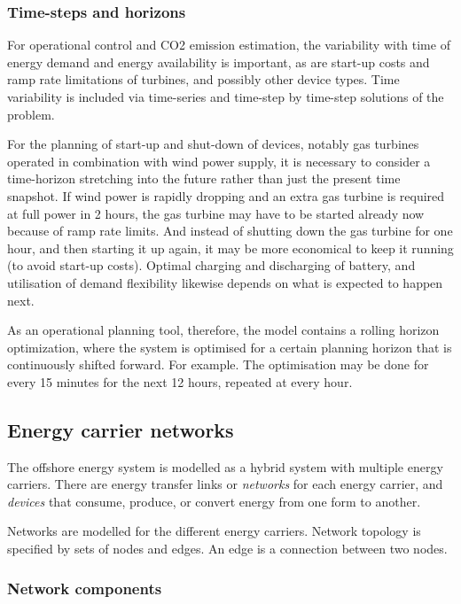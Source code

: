 \documentclass[12pt]{article}
\begin{document}
\subsubsection{Time-steps and horizons}

For operational control and CO2 emission estimation, the variability with time of energy demand and energy availability is important, as are start-up costs and ramp rate limitations of turbines, and possibly other device types. Time variability is included via time-series and time-step by time-step solutions of the problem.

For the planning of start-up and shut-down of devices, notably gas turbines operated in combination with wind power supply, it is necessary to consider a time-horizon stretching into the future rather than just the present time snapshot. If wind power is rapidly dropping and an extra gas turbine is required at full power in 2 hours, the gas turbine may have to be started already now because of ramp rate limits. And instead of shutting down the gas turbine for one hour, and then starting it up again, it may be more economical to keep it running (to avoid start-up costs). Optimal charging and discharging of battery, and utilisation of demand flexibility likewise depends on what is expected to happen next.

As an operational planning tool, therefore, the model contains a rolling horizon optimization, where the system is optimised for a certain planning horizon that is continuously shifted forward. For example. The optimisation may be done for every 15 minutes for the next 12 hours, repeated at every hour.



\subsection{Energy carrier networks}

The offshore energy system is modelled as a hybrid system with multiple energy carriers. 
There are energy transfer links or \emph{networks} for each energy carrier,
 and \emph{devices} that consume, produce, or convert energy from one form to another.


Networks are modelled for the different energy carriers. Network topology is specified by sets of nodes and edges. An edge is a connection between two nodes.


\subsubsection{Network components}
\end{document}
